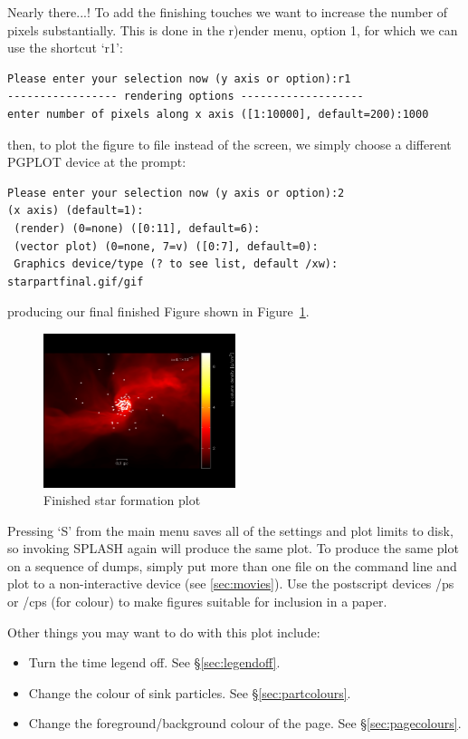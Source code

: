 \documentclass[a4paper,10pt]{article}
\newcommand{\splash}{\textsc{SPLASH }}
\begin{document}
 Nearly there...! To add the finishing touches we want to increase the number of pixels substantially. This is done in the r)ender menu, option 1, for which we can use the shortcut `r1':
\begin{verbatim}
Please enter your selection now (y axis or option):r1
----------------- rendering options -------------------
enter number of pixels along x axis ([1:10000], default=200):1000
\end{verbatim}
then, to plot the figure to file instead of the screen, we simply choose a different PGPLOT device at the prompt:
\begin{verbatim}
Please enter your selection now (y axis or option):2
(x axis) (default=1):
 (render) (0=none) ([0:11], default=6):
 (vector plot) (0=none, 7=v) ([0:7], default=0):
 Graphics device/type (? to see list, default /xw): starpartfinal.gif/gif
\end{verbatim}
producing our final finished Figure shown in Figure~\ref{fig:starfinal}.
\begin{figure}[h!]
\begin{center}
\includegraphics[width=0.5\textwidth]{starpartfinal.png}
\caption{Finished star formation plot}
\label{fig:starfinal}
\end{center}
\end{figure}

 Pressing `S' from the main menu saves all of the settings and plot limits to disk, so invoking \splash again will produce the same plot. To produce the same plot on a sequence of dumps, simply put more than one file on the command line and plot to a non-interactive device (see \ref{sec:movies}). Use the postscript devices /ps or /cps (for colour) to make figures suitable for inclusion in a paper.

Other things you may want to do with this plot include:
\begin{itemize}
\item Turn the time legend off. See \S\ref{sec:legendoff}.
\item Change the colour of sink particles. See \S\ref{sec:partcolours}.
\item Change the foreground/background colour of the page. See \S\ref{sec:pagecolours}.
\end{itemize}
\end{document}
